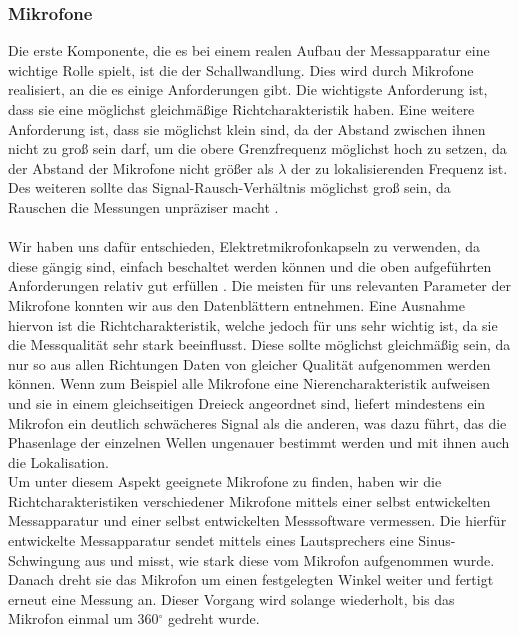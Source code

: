   \subsubsection{Mikrofone}
  Die erste Komponente, die es bei einem realen Aufbau der Messapparatur eine wichtige Rolle spielt, ist die der Schallwandlung. Dies wird durch Mikrofone realisiert, an die es einige Anforderungen gibt. Die wichtigste Anforderung ist, dass sie eine möglichst gleichmäßige Richtcharakteristik haben.
  Eine weitere Anforderung ist, dass sie möglichst klein sind, da der Abstand zwischen ihnen nicht zu groß sein darf, um die obere Grenzfrequenz möglichst hoch zu setzen, da der Abstand der Mikrofone nicht größer als $\lambda$ der zu lokalisierenden Frequenz ist. Des weiteren sollte das Signal-Rausch-Verhältnis möglichst groß sein, da Rauschen die Messungen unpräziser macht \cite{Rausch}.\\
  \\
  Wir haben uns dafür entschieden, Elektretmikrofonkapseln zu verwenden, da diese gängig sind, einfach beschaltet werden können und die oben aufgeführten Anforderungen relativ gut erfüllen \cite{elektret}. 
  Die meisten für uns relevanten Parameter der Mikrofone konnten wir aus den Datenblättern entnehmen. Eine Ausnahme hiervon ist die Richtcharakteristik, welche jedoch für uns sehr wichtig ist, da sie die Messqualität sehr stark beeinflusst. Diese sollte möglichst gleichmäßig sein, da nur so aus allen Richtungen Daten von gleicher Qualität aufgenommen werden können. Wenn zum Beispiel alle Mikrofone eine Nierencharakteristik aufweisen und sie in einem gleichseitigen Dreieck angeordnet sind, liefert mindestens ein Mikrofon ein deutlich schwächeres Signal als die anderen, was dazu führt, das die Phasenlage der einzelnen Wellen ungenauer bestimmt werden und mit ihnen auch die Lokalisation.\\
  Um unter diesem Aspekt geeignete Mikrofone zu finden, haben wir die Richtcharakteristiken verschiedener Mikrofone mittels einer selbst entwickelten Messapparatur und einer selbst entwickelten Messsoftware vermessen. Die hierfür entwickelte Messapparatur sendet mittels eines Lautsprechers eine Sinus-Schwingung aus und misst, wie stark diese vom Mikrofon aufgenommen wurde. Danach dreht sie das Mikrofon um einen festgelegten Winkel weiter und fertigt erneut eine Messung an. Dieser Vorgang wird solange wiederholt, bis das Mikrofon einmal um 360$^{\circ}$ gedreht wurde. 

